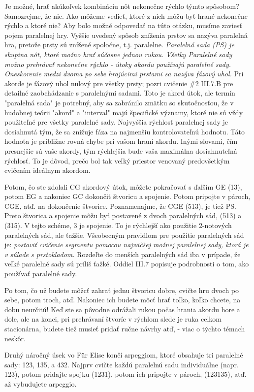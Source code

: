 Je možné, hrať akúkoľvek kombináciu nôt nekonečne rýchlo týmto spôsobom? Samozrejme, že nie. Ako môžeme vedieť, ktoré z nich môžu byť hrané nekonečne rýchlo a ktoré nie? Aby bolo možné odpovedať na túto otázku, musíme zaviesť pojem paralelnej hry. Vyššie uvedený spôsob zníženia prstov sa nazýva paralelná hra, pretože prsty sú znížené spoločne, t.j. paralelne. \emph{Paralelná sada (PS) je skupina nôt, ktoré možno hrať súčasne jednou rukou. Všetky Paralelné sady možno prehrávať nekonečne rýchlo - útoky akordu používajú paralelné sady. Oneskorenie medzi dvoma po sebe hrajúcimi prstami sa nazýva fázový uhol.} Pri akorde je fázový uhol nulový pre všetky prsty; pozri cvičenie \#2 III.7.B pre detailné zaobchádzanie s paralelnými sadami. Toto je akord útok, ale termín "paralelná sada" je potrebný, aby sa zabránilo zmätku so skutočnosťou, že v hudobnej teórii "akord" a "interval" majú špecifické významy, ktoré nie sú vždy použiteľné pre všetky paralelné sady. Najvyššia rýchlosť paralelnej sady je dosiahnutá tým, že sa znižuje fáza na najmenšiu kontrolovateľnú hodnotu. Táto hodnota je približne rovná chybe pri vašom hraní akordu. Inými slovami, čím presnejšie sú vaše akordy, tým rýchlejšia bude vaša maximálna dosiahnuteľná rýchlosť. To je dôvod, prečo bol tak veľký priestor venovaný predovšetkým cvičením ideálnym akordom.

Potom, čo ste zdolali CG akordový útok, môžete pokračovať s ďalším GE (13), potom EG a nakoniec GC dokončiť štvoricu a spojenie. Potom pripojte v pároch, CGE, atď. na dokončenie štvorice. Poznamenajme, že CGE (513), je tiež PS. Preto štvorica a spojenie môžu byť postavené z dvoch paralelných sád, (513) a (315). V tejto schéme, 3 je spojenie. To je rýchlejší ako použitie 2-notových paralelných sád, ale ťažšie. Všeobecným pravidlom pre použitie paralelných sád je: \emph{postaviť cvičenie segmentu pomocou najväčšej možnej paralelnej sady, ktorá je v súlade s prstokladom.} Rozdeľte do menších paralelných sád iba v prípade, že veľké paralelné sady sú príliš ťažké. Oddiel III.7 popisuje podrobnosti o tom, ako používať paralelné sady.

Po tom, čo už budete môžcť zahrať jednu štvoricu dobre, cvičte hru dvoch po sebe, potom troch, atď. Nakoniec ich budete môcť hrať toľko, koľko chcete, na dobu neurčitú! Keď ste sa pôvodne odrážali rukou počas hrania akordu hore a dole, ale na konci, pri prehrávaní štvoríc v rýchlom slede je ruka celkom stacionárna, budete tiež musieť pridať ručne návrhy atď, - viac o týchto témach neskôr.

Druhý náročný úsek vo Für Elise končí arpeggiom, ktoré obsahuje tri paralelné sady: 123, 135, a 432. Najprv cvičte každú paralelnú sadu individuálne (napr. 123), potom pridajte spojku (1231), potom ich pripojte v pároch, (123135), atď. až vybudujete arpeggio.

